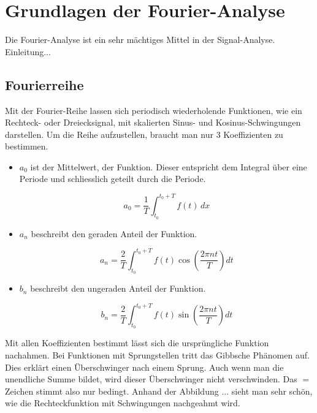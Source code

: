%
%
%
%

\section{Grundlagen der Fourier-Analyse\label{fourier:section:teil0}}

Die Fourier-Analyse ist ein sehr mächtiges Mittel in der Signal-Analyse. 
Einleitung...


\subsection{Fourierreihe\label{fourier:subsection:fourierreihe}}

Mit der Fourier-Reihe lassen sich periodisch wiederholende Funktionen, wie ein Rechteck- oder Dreiecksignal, mit skalierten Sinus- und Kosinus-Schwingungen darstellen.
Um die Reihe aufzustellen, braucht man nur 3 Koeffizienten zu bestimmen. 

\begin{itemize}
	\item $a_0$ ist der Mittelwert, der Funktion. 
	Dieser entspricht dem Integral über eine Periode und schliesslich geteilt durch die Periode. 
	
	\begin{equation}
		a_0 = \frac{1}{T} \int_{t_0}^{t_0 + T} f(t) \, dx
	\end{equation}
	
	\item $a_n$ beschreibt den geraden Anteil der Funktion.
	
	\begin{equation}
		a_n = \frac{2}{T} \int_{t_0}^{t_0 + T} f(t) \cos\left(\frac{2\pi n t}{T}\right) dt
	\end{equation}
	
	\item $b_n$ beschreibt den ungeraden Anteil der Funktion.
	
	\begin{equation}
		b_n = \frac{2}{T} \int_{t_0}^{t_0 + T} f(t) \sin\left(\frac{2\pi n t}{T}\right) dt
	\end{equation}
	
\end{itemize}

Mit allen Koeffizienten bestimmt lässt sich die ursprüngliche Funktion nachahmen.
Bei Funktionen mit Sprungstellen tritt das Gibbsche Phänomen auf.
Dies erklärt einen Überschwinger nach einem Sprung. Auch wenn man die unendliche Summe bildet, wird dieser Überschwinger nicht verschwinden.
Das $=$ Zeichen stimmt also nur bedingt.
Anhand der Abbildung ... sieht man sehr schön, wie die Rechteckfunktion mit Schwingungen nachgeahmt wird.

